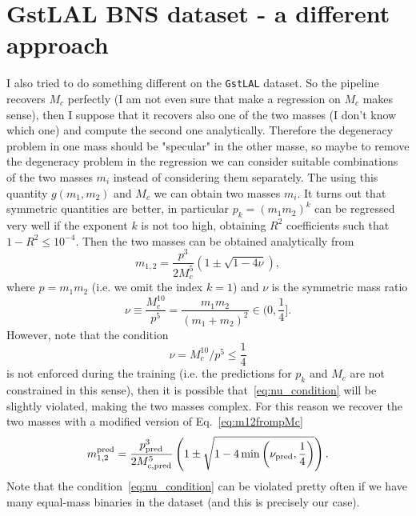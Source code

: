 \documentclass[prd,aps,twocolumn,a4paper,showkeys,nofootinbib]{article}
\begin{document}
\section{GstLAL BNS dataset - a different approach}
\label{sec:GstLAL2}
I also tried to do something different on the \texttt{GstLAL} dataset. 
So the pipeline recovers $M_c$ perfectly (I am not even sure that make a regression on $M_c$
makes sense), then I suppose that it recovers also one of the two masses 
(I don't know which one) and compute the second one analytically. Therefore the degeneracy problem
in one mass should be "specular" in the other masse, so maybe to remove the degeneracy problem
in the regression we can consider suitable combinations of the two masses $m_i$ instead of 
considering them separately. The using this quantity $g(m_1,m_2)$ and $M_c$ we can obtain 
two masses $m_i$. It turns out that symmetric quantities are better, in particular 
$p_k= (m_1 m_2)^k$ can be regressed very well if the exponent $k$ is not too high, 
obtaining $R^2$ coefficients such that $1-R^2 \leq 10^{-4}$. Then the two masses can be
obtained analytically from
\begin{equation}
\label{eq:m12frompMc}
m_{1,2} = \frac{p^3}{2 M_c^5}\left( 1 \pm \sqrt{1-4\nu} \right),
\end{equation}
where $p=m_1 m_2$ (i.e. we omit the index $k=1$) and $\nu$ is the symmetric mass ratio
\begin{equation}
\nu \equiv \frac{M_c^{10}}{p^5} = \frac{m_1 m_2}{(m_1+m_2)^2}\in (0, \frac{1}{4}].
\end{equation}
However, note that the condition
\begin{equation}
\label{eq:nu_condition}
\nu=M_c^{10}/p^5\leq \frac{1}{4}
\end{equation} 
is not enforced during the training (i.e. the predictions for 
$p_k$ and $M_c$ are not constrained in this sense), 
then it is possible that~\eqref{eq:nu_condition} will be slightly violated, making
the two masses complex. For this reason we recover the two masses with a modified version
of Eq.~\eqref{eq:m12frompMc}
\begin{equation}
\label{eq:m12frompMc_mod}
m_{1,2}^{\rm pred} = \frac{p_{\rm pred}^3}{2 M_{c, \rm pred}^5}\left( 1 \pm \sqrt{1-4 \min\left(\nu_{\rm pred}, \frac{1}{4}\right)} \right).
\end{equation}
Note that the condition~\eqref{eq:nu_condition} can be violated pretty often 
if we have many equal-mass binaries in the dataset (and this is precisely our case).
\end{document}
